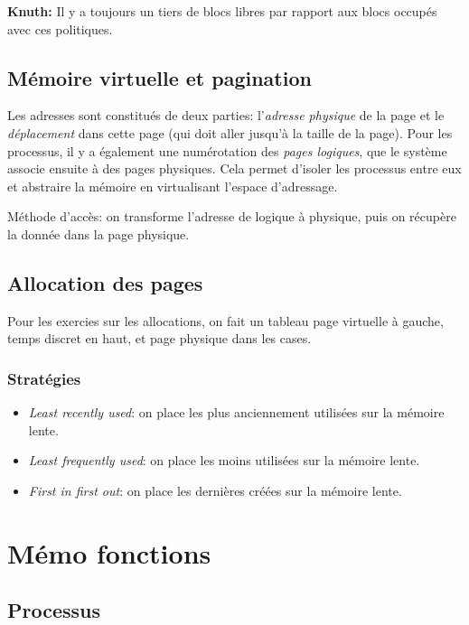 \documentclass[9pt,a4paper,twocolumn]{article}
\begin{document}
    \textbf{Knuth:} Il y a toujours un tiers de blocs libres par rapport aux blocs occupés avec ces politiques.

    \subsection{Mémoire virtuelle et pagination}

    Les adresses sont constitués de deux parties: l'\emph{adresse physique} de la page et le \emph{déplacement} dans cette page (qui doit aller jusqu'à la taille de la page).
    Pour les processus, il y a également une numérotation des \emph{pages logiques}, que le système associe ensuite à des pages physiques. Cela permet d'isoler les processus entre eux et abstraire la mémoire en virtualisant l'espace d'adressage.

    Méthode d'accès: on transforme l'adresse de logique à physique, puis on récupère la donnée dans la page physique.

    \subsection{Allocation des pages}

    Pour les exercies sur les allocations, on fait un tableau page virtuelle à gauche, temps discret en haut, et page physique dans les cases.

    \subsubsection{Stratégies}
    \begin{itemize}
        \item \emph{Least recently used}: on place les plus anciennement utilisées sur la mémoire lente.
        \item \emph{Least frequently used}: on place les moins utilisées sur la mémoire lente.
        \item \emph{First in first out}: on place les dernières créées sur la mémoire lente.
    \end{itemize}


\section{Mémo fonctions}

    \subsection{Processus}
\end{document}
